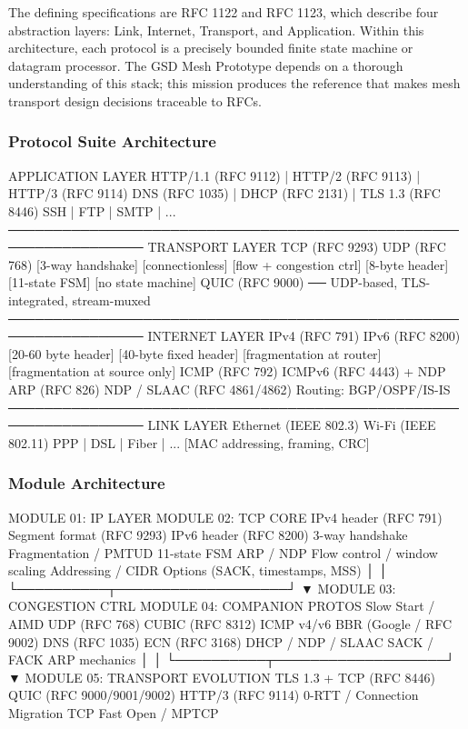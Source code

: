 \documentclass[11pt,letterpaper]{article}
\begin{document}
The defining specifications are RFC 1122 and RFC 1123, which describe four abstraction layers: Link, Internet, Transport, and Application. Within this architecture, each protocol is a precisely bounded finite state machine or datagram processor. The GSD Mesh Prototype depends on a thorough understanding of this stack; this mission produces the reference that makes mesh transport design decisions traceable to RFCs.

\subsubsection{Protocol Suite Architecture}

\begin{asciibox}
APPLICATION LAYER
  HTTP/1.1 (RFC 9112) | HTTP/2 (RFC 9113) | HTTP/3 (RFC 9114)
  DNS (RFC 1035) | DHCP (RFC 2131) | TLS 1.3 (RFC 8446)
  SSH | FTP | SMTP | ...
─────────────────────────────────────────────────────────────────
TRANSPORT LAYER
  TCP (RFC 9293)            UDP (RFC 768)
  [3-way handshake]         [connectionless]
  [flow + congestion ctrl]  [8-byte header]
  [11-state FSM]            [no state machine]
  QUIC (RFC 9000) ── UDP-based, TLS-integrated, stream-muxed
─────────────────────────────────────────────────────────────────
INTERNET LAYER
  IPv4 (RFC 791)            IPv6 (RFC 8200)
  [20-60 byte header]       [40-byte fixed header]
  [fragmentation at router] [fragmentation at source only]
  ICMP (RFC 792)            ICMPv6 (RFC 4443) + NDP
  ARP (RFC 826)             NDP / SLAAC (RFC 4861/4862)
  Routing: BGP/OSPF/IS-IS
─────────────────────────────────────────────────────────────────
LINK LAYER
  Ethernet (IEEE 802.3)    Wi-Fi (IEEE 802.11)
  PPP | DSL | Fiber | ...
  [MAC addressing, framing, CRC]
\end{asciibox}

\subsubsection{Module Architecture}

\begin{asciibox}
MODULE 01: IP LAYER           MODULE 02: TCP CORE
  IPv4 header (RFC 791)         Segment format (RFC 9293)
  IPv6 header (RFC 8200)        3-way handshake
  Fragmentation / PMTUD         11-state FSM
  ARP / NDP                     Flow control / window scaling
  Addressing / CIDR             Options (SACK, timestamps, MSS)
         │                              │
         └──────────┬───────────────────┘
                    ▼
MODULE 03: CONGESTION CTRL    MODULE 04: COMPANION PROTOS
  Slow Start / AIMD             UDP (RFC 768)
  CUBIC (RFC 8312)              ICMP v4/v6
  BBR (Google / RFC 9002)       DNS (RFC 1035)
  ECN (RFC 3168)                DHCP / NDP / SLAAC
  SACK / FACK                   ARP mechanics
         │                              │
         └──────────┬───────────────────┘
                    ▼
         MODULE 05: TRANSPORT EVOLUTION
           TLS 1.3 + TCP (RFC 8446)
           QUIC (RFC 9000/9001/9002)
           HTTP/3 (RFC 9114)
           0-RTT / Connection Migration
           TCP Fast Open / MPTCP
\end{asciibox}
\end{document}
